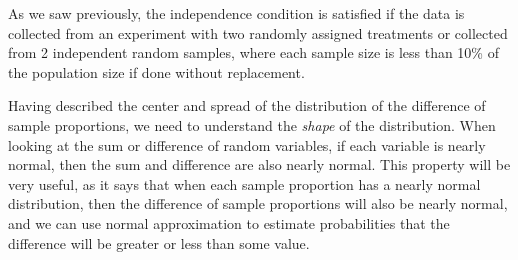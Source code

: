 As we saw previously, the independence condition is satisfied if the data is collected from an experiment with two randomly assigned treatments or collected from 2 independent random samples, where each sample size is less than 10\% of the population size if done without replacement.

Having described the center and spread of the distribution of the difference of sample proportions, we need to understand the \emph{shape} of the distribution.  When looking at the sum or difference of random variables, if each variable is nearly normal, then the sum and difference are also nearly normal.  This property will be very useful, as it says that when each sample proportion has a nearly normal distribution, then the difference of sample proportions will also be nearly normal, and we can use normal approximation to estimate probabilities that the difference will be greater or less than some value.

